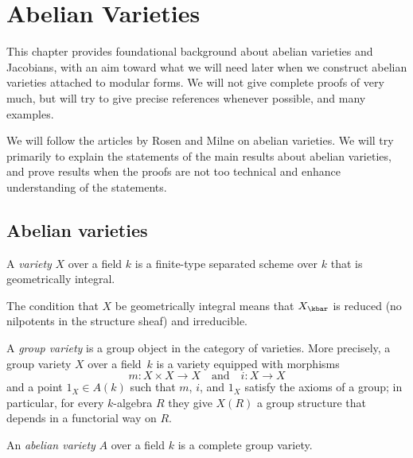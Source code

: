 \documentclass{report}
\begin{document}
\chapter{Abelian Varieties}

This chapter provides foundational background about abelian
varieties and Jacobians, with an aim toward what we will need
later when we construct abelian varieties attached to modular
forms.  We will not give complete proofs of very much, but will
try to give precise references whenever possible, and many
examples.

We will follow the articles by Rosen \cite{rosen:abvars} and Milne
\cite{milne:abvars} on abelian varieties.  We will try primarily
to explain the statements of the main results about abelian
varieties, and prove results when the proofs are not too technical
and enhance understanding of the statements.


\section{Abelian varieties}

\begin{definition}[Variety]
A {\em variety} $X$ over a field $k$ is a finite-type separated
scheme over $k$ that is geometrically integral.
\end{definition}
The condition that $X$ be geometrically integral means that
$X_{\kbar}$ is reduced (no nilpotents in the structure sheaf) and
irreducible.


\begin{definition}
A {\em group variety} is a group object in the category of
varieties. More precisely,  a group variety $X$ over a field~$k$
is a variety equipped with morphisms
\[
  m: X \times X \to X
\quad\text{and}\quad i:X\to X
\]
and a point $1_X\in A(k)$ such that $m$, $i$, and $1_X$ satisfy
the axioms of a group; in particular, for every $k$-algebra $R$
they give $X(R)$ a group structure that depends in a functorial
way on $R$.
\end{definition}

\begin{definition}
An {\em abelian variety} $A$ over a field $k$ is a complete group
variety.
\end{definition}
\end{document}
